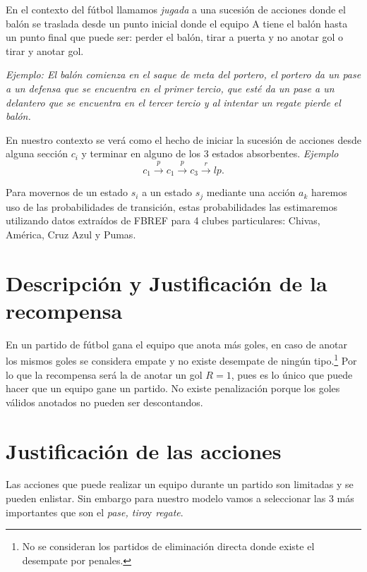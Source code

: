 \documentclass[
  us-letterpaper,
  DIV=11,
  numbers=noendperiod]{scrreprt}
\begin{document}
En el contexto del fútbol llamamos \emph{jugada} a una sucesión de
acciones donde el balón se traslada desde un punto inicial donde el
equipo A tiene el balón hasta un punto final que puede ser: perder el
balón, tirar a puerta y no anotar gol o tirar y anotar gol.

\emph{Ejemplo: El balón comienza en el saque de meta del portero, el
portero da un pase a un defensa que se encuentra en el primer tercio,
que esté da un pase a un delantero que se encuentra en el tercer tercio
y al intentar un regate pierde el balón.}

En nuestro contexto se verá como el hecho de iniciar la sucesión de
acciones desde alguna sección \(c_i\) y terminar en alguno de los 3
estados absorbentes. \emph{Ejemplo} \[
c_1\xrightarrow{p}c_1\xrightarrow{p}c_3\xrightarrow{r}lp.
\]

Para movernos de un estado \(s_i\) a un estado \(s_j\) mediante una
acción \(a_k\) haremos uso de las probabilidades de transición, estas
probabilidades las estimaremos utilizando datos extraídos de FBREF para
4 clubes particulares: Chivas, América, Cruz Azul y Pumas.


\chapter{Descripción y Justificación de la
recompensa}\label{descripciuxf3n-y-justificaciuxf3n-de-la-recompensa}

En un partido de fútbol gana el equipo que anota más goles, en caso de
anotar los mismos goles se considera empate y no existe desempate de
ningún tipo.\footnote{No se consideran los partidos de eliminación
  directa donde existe el desempate por penales.} Por lo que la
recompensa será la de anotar un gol \(R=1\), pues es lo único que puede
hacer que un equipo gane un partido. No existe penalización porque los
goles válidos anotados no pueden ser descontandos.


\chapter{Justificación de las
acciones}\label{justificaciuxf3n-de-las-acciones}

Las acciones que puede realizar un equipo durante un partido son
limitadas y se pueden enlistar. Sin embargo para nuestro modelo vamos a
seleccionar las 3 más importantes que son el \emph{pase, tiro}y
\emph{regate}.
\end{document}
